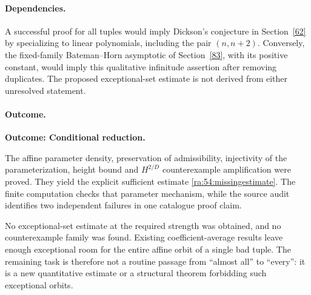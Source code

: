 \documentclass[11pt]{article}
\begin{document}
\paragraph{Dependencies.}
A successful proof for all tuples would imply Dickson's conjecture in
Section~\ref{62} by specializing to linear polynomials, including the
pair $(n,n+2)$. Conversely, the fixed-family Bateman--Horn asymptotic of
Section~\ref{83}, with its positive constant, would imply this qualitative
infinitude assertion after removing duplicates. The proposed
exceptional-set estimate is not derived from either unresolved statement.

\paragraph{Outcome.}
\textbf{Outcome: Conditional reduction.}

The affine parameter density, preservation of admissibility, injectivity
of the parameterization, height bound and $H^{2/D}$ counterexample
amplification were proved. They yield the explicit sufficient estimate
\eqref{ra:54:missingestimate}. The finite computation checks that
parameter mechanism, while the source audit identifies two independent
failures in one catalogue proof claim.

No exceptional-set estimate at the required strength was obtained, and
no counterexample family was found. Existing coefficient-average results
leave enough exceptional room for the entire affine orbit of a single
bad tuple. The remaining task is therefore not a routine passage from
``almost all'' to ``every'': it is a new quantitative estimate or a
structural theorem forbidding such exceptional orbits.
\end{document}

